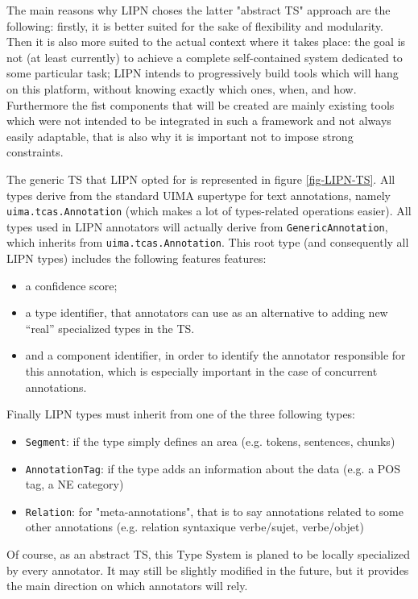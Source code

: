 The main reasons why LIPN choses the latter "abstract TS" approach are the following: firstly, it is better suited for the sake of flexibility and modularity. Then it is also more suited to the actual context where it takes place: the goal is not (at least currently) to achieve a complete self-contained system dedicated to some particular task; LIPN intends to progressively build tools which will hang on this platform, without knowing exactly which ones, when, and how. Furthermore the fist components that will be created are mainly existing tools which were not intended to be integrated in such a framework and not always easily adaptable, that is also why it is important not to impose strong constraints.

The generic TS that LIPN opted for is represented in figure \ref{fig-LIPN-TS}. All types derive from the standard UIMA supertype for text annotations, namely {\tt uima.tcas.Annotation} (which makes a lot of types-related operations easier). All types used in LIPN annotators will actually derive from {\tt GenericAnnotation}, which inherits from {\tt uima.tcas.Annotation}. This root type (and consequently all LIPN types) includes the following features  features:
\begin{itemize}
\item a confidence score;
\item a type identifier, that annotators can use as an alternative to adding new ``real'' specialized types in the TS. 
\item and a component identifier, in order to identify the annotator responsible for this annotation, which is especially important in the case of concurrent annotations.
\end{itemize}

Finally LIPN types must inherit from  one of the three following types:
\begin{itemize}
\item {\tt Segment}: if the type simply defines an area (e.g. tokens, sentences, chunks)
\item {\tt AnnotationTag}: if the type adds an information about the data (e.g. a POS tag, a NE category)
\item {\tt Relation}: for "meta-annotations", that is to say annotations related to some other annotations (e.g. relation syntaxique verbe/sujet, verbe/objet)
\end{itemize}

Of course, as an abstract TS, this Type System is planed to be locally specialized by every annotator. It may still be slightly modified in the future, but it provides the main direction on which annotators will rely.

